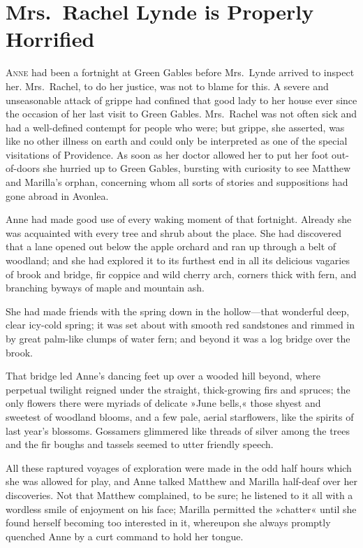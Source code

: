 \chapter{Mrs.~Rachel Lynde is Properly Horrified}

\lettrine[lines=4]{A}{nne} had been a fortnight at Green Gables before Mrs.~Lynde arrived to inspect her. Mrs.~Rachel, to do her justice, was not to blame for this. A severe and unseasonable attack of grippe had confined that good lady to her house ever since the occasion of her last visit to Green Gables. Mrs.~Rachel was not often sick and had a well-defined contempt for people who were; but grippe, she asserted, was like no other illness on earth and could only be interpreted as one of the special visitations of Providence. As soon as her doctor allowed her to put her foot out-of-doors she hurried up to Green Gables, bursting with curiosity to see Matthew and Marilla's orphan, concerning whom all sorts of stories and suppositions had gone abroad in Avonlea.

Anne had made good use of every waking moment of that fortnight. Already she was acquainted with every tree and shrub about the place. She had discovered that a lane opened out below the apple orchard and ran up through a belt of woodland; and she had explored it to its furthest end in all its delicious vagaries of brook and bridge, fir coppice and wild cherry arch, corners thick with fern, and branching byways of maple and mountain ash.

She had made friends with the spring down in the hollow—that wonderful deep, clear icy-cold spring; it was set about with smooth red sandstones and rimmed in by great palm-like clumps of water fern; and beyond it was a log bridge over the brook.

That bridge led Anne's dancing feet up over a wooded hill beyond, where perpetual twilight reigned under the straight, thick-growing firs and spruces; the only flowers there were myriads of delicate »June bells,« those shyest and sweetest of woodland blooms, and a few pale, aerial starflowers, like the spirits of last year's blossoms. Gossamers glimmered like threads of silver among the trees and the fir boughs and tassels seemed to utter friendly speech.

All these raptured voyages of exploration were made in the odd half hours which she was allowed for play, and Anne talked Matthew and Marilla half-deaf over her discoveries. Not that Matthew complained, to be sure; he listened to it all with a wordless smile of enjoyment on his face; Marilla permitted the »chatter« until she found herself becoming too interested in it, whereupon she always promptly quenched Anne by a curt command to hold her tongue.

